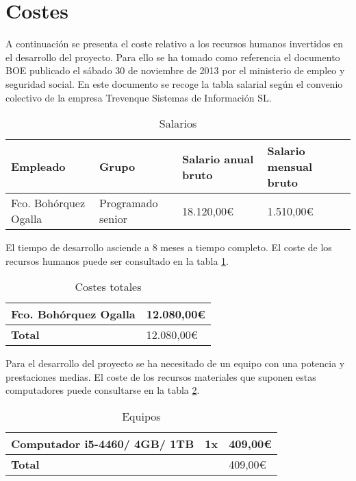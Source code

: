 \section{Costes}
A continuación se presenta el coste relativo a los recursos humanos invertidos en el desarrollo del 
proyecto. Para ello se ha tomado como referencia el documento BOE publicado el sábado 30 de noviembre de 2013
por el ministerio de empleo y seguridad social. En este documento se recoge la tabla salarial según
el convenio colectivo de la empresa Trevenque Sistemas de Información SL.
\begin{table}[h]
\begin{tabular}{|l|l|l|l|} \hline
\textbf{Empleado} & \textbf{Grupo} & \textbf{Salario anual bruto} & \textbf{Salario mensual bruto}  \\ \hline
Fco. Bohórquez Ogalla & Programado senior & 18.120,00\euro & 1.510,00\euro \\ \hline
\end{tabular}
\caption{Salarios}
\end{table}


El tiempo de desarrollo asciende a 8 meses a tiempo completo. El coste de los recursos humanos puede ser consultado en la tabla \ref{table:totalcost}.
\begin{table}[h]
\begin{tabular}{|l|l|} \hline
\textbf{Fco. Bohórquez Ogalla } &  12.080,00\euro \\ \hline
\textbf{Total} &  12.080,00\euro \\ \hline
\end{tabular}
\caption{Costes totales}
\label{table:totalcost}
\end{table}
 
 Para el desarrollo del proyecto se ha necesitado de un equipo con una potencia y prestaciones medias. El
 coste de los recursos materiales que suponen estas computadores puede consultarse en la tabla \ref {table:hardcost}.
 
 \begin{table}[h]
 \begin{tabular}{|l|l|l|} \hline
\textbf{Computador \tiny{i5-4460/ 4GB/ 1TB} } & 1x & 409,00\euro \\ \hline
\textbf{Total} & & 409,00\euro \\ \hline
\end{tabular}
\caption{Equipos}
\label{table:hardcost}
\end{table}

